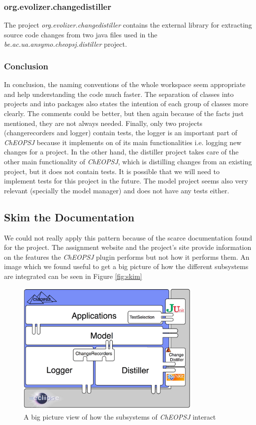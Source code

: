 \documentclass{article}
\begin{document}
\subsubsection{org.evolizer.changedistiller}
The project \emph{org.evolizer.changedistiller} contains the external library for extracting source code changes from two java files used in the \emph{be.ac.ua.ansymo.cheopsj.distiller} project.

\subsubsection{Conclusion}
In conclusion, the naming conventions of the whole workspace seem appropriate and help understanding the code much faster. The separation of classes into projects and into packages also states the intention of each group of classes more clearly. The comments could be better, but then again because of the facts just mentioned, they are not always needed. Finally, only two projects (changerecorders and logger) contain tests, the logger is an important part of \emph{ChEOPSJ} because it implements on of its main functionalities i.e. logging new changes for a project. In the other hand, the distiller project takes care of the other main functionality of \emph{ChEOPSJ}, which is distilling changes from an existing project, but it does not contain tests. It is possible that we will need to implement tests for this project in the future. The model project seems also very relevant (specially the model manager) and does not have any tests either.

\subsection{Skim the Documentation}
We could not really apply this pattern because of the scarce documentation found for the project. The assignment website and the project's site provide information on the features the \emph{ChEOPSJ} plugin performs but not how it performs them. An image which we found useful to get a big picture of how the different subsystems are integrated can be seen in Figure \ref{fig:skim}

\begin{figure}[h]
\centering
\includegraphics[width=0.8\textwidth]{Images/skim}
\caption{A big picture view of how the subsystems of \emph{ChEOPSJ} interact}
\label{fig:spec0}
\end{figure}
\end{document}
